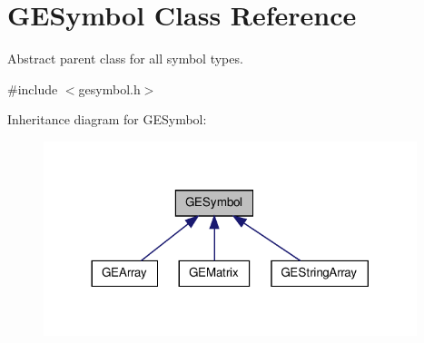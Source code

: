 \hypertarget{class_g_e_symbol}{\section{G\-E\-Symbol Class Reference}
\label{class_g_e_symbol}
}


Abstract parent class for all symbol types.  




{\ttfamily \#include $<$gesymbol.\-h$>$}



Inheritance diagram for G\-E\-Symbol\-:
\nopagebreak
\begin{figure}[H]
\begin{center}
\leavevmode
\includegraphics[width=308pt]{class_g_e_symbol__inherit__graph}
\end{center}
\end{figure}
